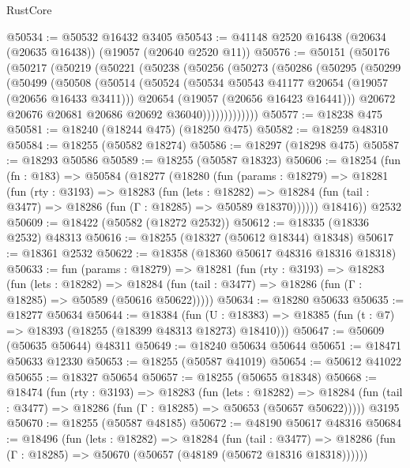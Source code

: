 \begin{lexlean}{RustCore}
\begin{coremodule}
@50534 := @50532 @16432 @3405
@50543 := @41148 @2520 @16438 (@20634 (@20635 @16438)) (@19057 (@20640 @2520 @11))
@50576 := @50151
    (@50176
      (@50217
        (@50219
          (@50221
            (@50238
              (@50256
                (@50273
                  (@50286
                    (@50295
                      (@50299
                        (@50499
                          (@50508
                            (@50514
                              (@50524
                                (@50534 @50543 @41177 @20654 (@19057 (@20656 @16433 @3411)))
                                @20654
                                (@19057 (@20656 @16423 @16441)))
                              @20672
                              @20676
                              @20681
                              @20686
                              @20692
                              @36040)))))))))))))
@50577 := @18238 @475
@50581 := @18240 (@18244 @475) (@18250 @475)
@50582 := @18259 @48310
@50584 := @18255 (@50582 @18274)
@50586 := @18297 (@18298 @475)
@50587 := @18293 @50586
@50589 := @18255 (@50587 @18323)
@50606 := @18254
    (fun (fn : @183) =>
    @50584
      (@18277
        (@18280
          (fun (params : @18279) =>
          @18281
            (fun (rty : @3193) =>
            @18283
              (fun (lets : @18282) =>
              @18284 (fun (tail : @3477) => @18286 (fun (Γ : @18285) => @50589 @18370))))))
        @18416))
    @2532
@50609 := @18422 (@50582 (@18272 @2532))
@50612 := @18335 (@18336 @2532) @48313
@50616 := @18255 (@18327 (@50612 @18344) @18348)
@50617 := @18361 @2532
@50622 := @18358 (@18360 @50617 @48316 @18316 @18318)
@50633 := fun (params : @18279) =>
  @18281
    (fun (rty : @3193) =>
    @18283
      (fun (lets : @18282) =>
      @18284 (fun (tail : @3477) => @18286 (fun (Γ : @18285) => @50589 (@50616 @50622)))))
@50634 := @18280 @50633
@50635 := @18277 @50634
@50644 := @18384
    (fun (U : @18383) => @18385 (fun (t : @7) => @18393 (@18255 (@18399 @48313 @18273) @18410)))
@50647 := @50609 (@50635 @50644) @48311
@50649 := @18240 @50634 @50644
@50651 := @18471 @50633 @12330
@50653 := @18255 (@50587 @41019)
@50654 := @50612 @41022
@50655 := @18327 @50654
@50657 := @18255 (@50655 @18348)
@50668 := @18474
    (fun (rty : @3193) =>
    @18283
      (fun (lets : @18282) =>
      @18284 (fun (tail : @3477) => @18286 (fun (Γ : @18285) => @50653 (@50657 @50622)))))
    @3195
@50670 := @18255 (@50587 @48185)
@50672 := @48190 @50617 @48316
@50684 := @18496
    (fun (lets : @18282) =>
    @18284
      (fun (tail : @3477) =>
      @18286 (fun (Γ : @18285) => @50670 (@50657 (@48189 (@50672 @18316 @18318))))))

\end{coremodule}
\end{lexlean}
